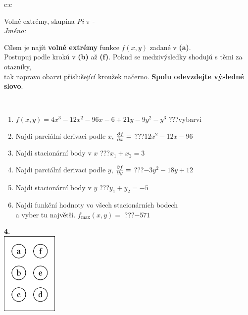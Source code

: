 \documentclass[10pt]{report}
\begin{document}
\begin{tabular}{c:c}
\begin{minipage}[c][104.5mm][t]{0.5\linewidth}
\begin{center}
\vspace{7mm}
{\huge Volné extrémy, skupina \textit{Pi $\pi$} -}\\[5mm]
\textit{Jméno:}\phantom{xxxxxxxxxxxxxxxxxxxxxxxxxxxxxxxxxxxxxxxxxxxxxxxxxxxxxxxxxxxxxxxxx}\\[5mm]
\begin{minipage}{0.95\linewidth}
\begin{center}
Cílem je najít \textbf{volné extrémy} funkce $f(x,y)$ zadané v \textbf{(a)}.\\Postupuj podle krokú v \textbf{(b)} až \textbf{(f)}. Pokud se medzivýsledky shodujú s těmi za otazníky,\\tak napravo obarvi příslušející kroužek načerno. \textbf{Spolu odevzdejte výsledné slovo}.
\end{center}
\end{minipage}
\\[1mm]
\begin{minipage}{0.79\linewidth}
\begin{center}
\begin{varwidth}{\linewidth}
\begin{enumerate}
\normalsize
\item $f(x,y)=4x^3-12x^2-96x-6+21y-9y^2-y^3$\quad \dotfill\; ???\;\dotfill \quad vybarvi
\item Najdi parciální derivaci podle $x$, $\pdv{f}{x}=$\quad \dotfill\; ???\;\dotfill \quad $12x^2-12x-96$
\item Najdi stacionární body v $x$\quad \dotfill\; ???\;\dotfill \quad $x_1+x_2=3$
\item Najdi parciální derivaci podle $y$, $\pdv{f}{y}=$\quad \dotfill\; ???\;\dotfill \quad $-3y^2-18y+12$
\item Najdi stacionární body v $y$\quad \dotfill\; ???\;\dotfill \quad $y_1+y_2=-5$
\item Najdi funkční hodnoty vo všech stacionárních bodech \\ \phantom{xxxxxx} a vyber tu najvětší. $f_{\text{max}}(x,y)=$\quad \dotfill\; ???\;\dotfill \quad $-571$
\end{enumerate}
\end{varwidth}
\end{center}
\end{minipage}
\begin{minipage}{0.20\linewidth}
\begin{center}
{\Huge\bfseries 4.} \\[2mm]
\includegraphics[height=40mm]{../images/braille.png}

\end{center}
\end{minipage}
\end{center}
\end{minipage}
\end{tabular}
\end{document}

